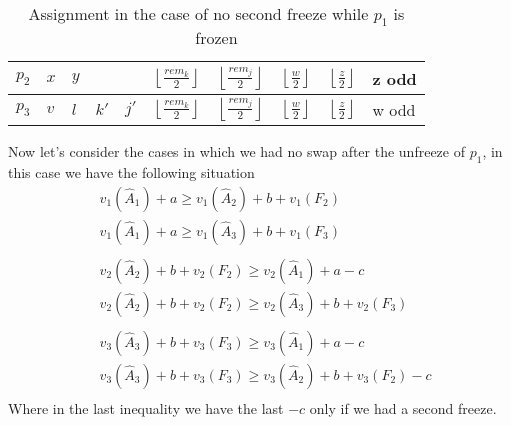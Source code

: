 \documentclass{article}
\newcommand{\floor}[3][2]{\left \lfloor\frac{#2}{#3}\right \rfloor}
\begin{document}
\begin{itemize}
    \begin{table}[h]
        \begin{tabular}{|l|l|l|l|l|l|l|l|l|l|}
            \hline
            $p_2$ & $x$ & $y$ &      &    &   $\floor{rem_k}{2}$ & $\floor{rem_j}{2}$ & $\floor{w}{2}$ & $\floor{z}{2}$ & z odd \\ \hline
            $p_3$ & $v$ & $l$ & $k'$ & $j'$ & $\floor{rem_k}{2}$ & $\floor{rem_j}{2}$ & $\floor{w}{2}$ & $\floor{z}{2}$ & w odd \\ \hline
        \end{tabular}
        \caption{Assignment in the case of no second freeze while $p_1$ is frozen}
        \label{table:abb-abb-abb-assignment-in-the-case-of-no-second-freeze}
    \end{table}
    
\end{itemize}
Now let's consider the cases in which we had no swap after the unfreeze of $p_1$, in this case we have the following situation
\begin{align*}
    &v_1(\hat A_1) + a \ge v_1(\hat A_2) + b + v_1(F_2)\\
    &v_1(\hat A_1) + a \ge v_1(\hat A_3) + b + v_1(F_3)\\
    \\
    &v_2(\hat A_2) + b + v_2(F_2) \ge v_2(\hat A_1) + a - c \\
    &v_2(\hat A_2) + b + v_2(F_2) \ge v_2(\hat A_3) + b + v_2(F_3)\\
    \\
    &v_3(\hat A_3) + b + v_3(F_3) \ge v_3(\hat A_1) + a - c\\
    &v_3(\hat A_3) + b + v_3(F_3) \ge v_3(\hat A_2) + b + v_3(F_2) - c\\
\end{align*}
Where in the last inequality we have the last $-c$ only if we had a second freeze. 
\end{document}
